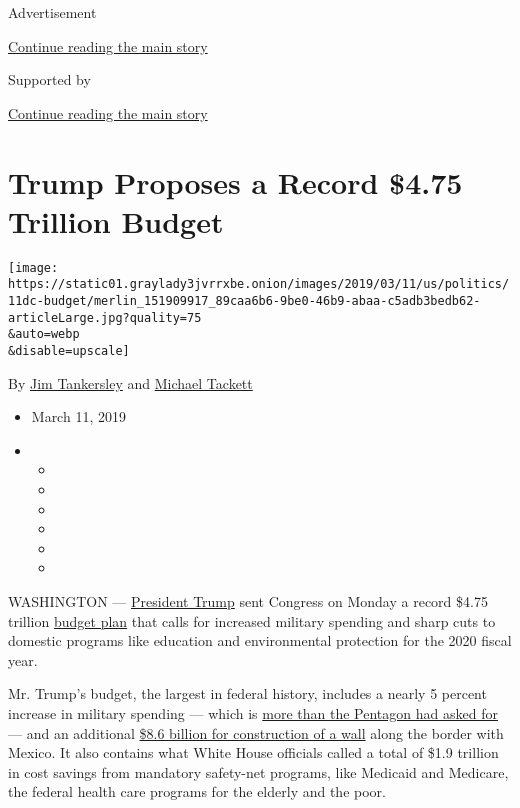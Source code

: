 Advertisement

\protect\hyperlink{after-top}{Continue reading the main story}

Supported by

\protect\hyperlink{after-sponsor}{Continue reading the main story}

\hypertarget{trump-proposes-a-record-475-trillion-budget}{%
\section{Trump Proposes a Record \$4.75 Trillion
Budget}\label{trump-proposes-a-record-475-trillion-budget}}

\texttt{[image: https://static01.graylady3jvrrxbe.onion/images/2019/03/11/us/politics/11dc-budget/merlin\_151909917\_89caa6b6-9be0-46b9-abaa-c5adb3bedb62-articleLarge.jpg?quality=75\\\&auto=webp\\\&disable=upscale]}

By \href{https://www.nytimes3xbfgragh.onion/by/jim-tankersley}{Jim
Tankersley} and
\href{https://www.nytimes3xbfgragh.onion/by/michael-tackett}{Michael
Tackett}

\begin{itemize}
\item
  March 11, 2019
\item
  \begin{itemize}
  \item
  \item
  \item
  \item
  \item
  \item
  \end{itemize}
\end{itemize}

WASHINGTON ---
\href{https://www.nytimes3xbfgragh.onion/2020/02/10/business/economy/trump-budget.html}{President
Trump} sent Congress on Monday a record \$4.75 trillion
\href{https://www.nytimes3xbfgragh.onion/2020/02/10/business/economy/trump-budget.html}{budget
plan} that calls for increased military spending and sharp cuts to
domestic programs like education and environmental protection for the
2020 fiscal year.

Mr. Trump's budget, the largest in federal history, includes a nearly 5
percent increase in military spending --- which is
\href{https://foreignpolicy.com/2019/03/10/pentagon-eyes-windfall-as-trump-seeks-750-billion-defense-budget-military/}{more
than the Pentagon had asked for} --- and an additional
\href{https://www.nytimes3xbfgragh.onion/2019/03/10/business/economy/trump-budget-wall.html}{\$8.6
billion for construction of a wall} along the border with Mexico. It
also contains what White House officials called a total of \$1.9
trillion in cost savings from mandatory safety-net programs, like
Medicaid and Medicare, the federal health care programs for the elderly
and the poor.

